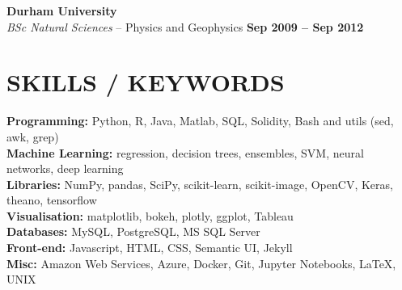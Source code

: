 \documentclass[margin,line]{resume}
\begin{document}
\begin{resume}
    \textbf{\listing Durham University} \vspace{1mm}\\
    \textsl{BSc Natural Sciences} -- Physics and Geophysics \hfill \textbf{Sep 2009 -- Sep 2012}\vspace{-3mm}\\\vspace{-1mm}%

    \vspace{-1mm}

\sectionline

    \section{\mysidestyle \textbf{\large{S}\small{KILLS} / \large{K}\small{EYWORDS}}}

    \textbf{Programming:} Python, R, Java, Matlab, SQL, Solidity,  Bash and utils (sed, awk, grep) \\
    \textbf{Machine Learning:} regression, decision trees, ensembles, SVM, neural networks, deep learning \\
    \textbf{Libraries:} NumPy, pandas, SciPy, scikit-learn, scikit-image, OpenCV, Keras, theano, tensorflow \\
    \textbf{Visualisation:} matplotlib, bokeh, plotly, ggplot, Tableau \\
    \textbf{Databases:} MySQL, PostgreSQL, MS SQL Server\\
    \textbf{Front-end:} Javascript, HTML, CSS, Semantic UI, Jekyll \\
    \textbf{Misc:} Amazon Web Services, Azure, Docker, Git, Jupyter Notebooks, \LaTeX, UNIX

\end{resume}
\end{document}
